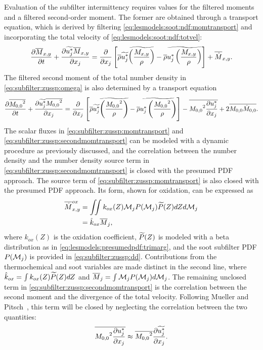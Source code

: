 Evaluation of the subfilter intermittency requires values for the filtered moments and a filtered second-order moment. The former are obtained through a transport equation, which is derived by filtering \cref{eq:lesmodels:soot:ndf:momtransport} and incorporating the total velocity of \cref{eq:lesmodels:soot:ndf:totvel}:
\begin{equation}\label{eq:subfilter:zussp:momtransport}
  \pder[\mean{M}_{x,y}]{t} + \pder[\tf{u_j^*}\mean{M}_{x,y}]{x_j} = \pder[]{x_j}\left[ \mean{\rho}\tf{u_j^*}\tf{ \left( \frac{M_{x,y}}{\rho} \right)} - \mean{\rho}\tf{u_j^* \left( \frac{M_{x,y}}{\rho}\right)} \right] + \fst[M]{x,y}.
\end{equation}
The filtered second moment of the total number density in \cref{eq:subfilter:zussp:omega} is also determined by a transport equation
\begin{equation}\label{eq:subfilter:zussp:secondmomtransport}
  \pder[\mean{{M_{0,0}}^2}]{t} + \pder[\tf{u_j^*}\mean{{M_{0,0}}^2}]{x_j} = \pder[]{x_j}\left[ \mean{\rho}\tf{u_j^*}\tf{\left( \frac{{M_{0,0}}^2}{\rho} \right)} - \mean{\rho}\tf{u_j^* \left( \frac{{M_{0,0}}^2}{\rho} \right)} \right] - \mean{{M_{0,0}}^2 \pder[u_j^*]{x_j}} + 2\mean{M_{0,0}\dot{M}_{0,0}}.
\end{equation}
The scalar fluxes in \cref{eq:subfilter:zussp:momtransport} and \cref{eq:subfilter:zussp:secondmomtransport} can be modeled with a dynamic procedure as previously discussed, and the correlation between the number density and the number density source term in \cref{eq:subfilter:zussp:secondmomtransport} is closed with the presumed PDF approach. The source term of \cref{eq:subfilter:zussp:momtransport} is also closed with the presumed PDF approach. Its form, shown for oxidation, can be expressed as
\begin{equation}\label{eq:subfilter:leszussp:ox}
  \begin{split}
    \mean{\dot{M}}_{x,y}^{ox} &= \iint k_{ox}(Z)\mc{M}_j P(\mc{M}_j)\pz dZ d\mc{M}_j \\
    &= \hat{k}_{ox}\mean{M}_j,
  \end{split}
\end{equation}
where $k_{ox}(Z)$ is the oxidation coefficient, $\pz$ is modeled with a beta distribution as in \cref{eq:lesmodels:presumedpdf:trimarg}, and the soot subfilter PDF $P(\mc{M}_j)$ is provided in \cref{eq:subfilter:zussp:dd}. Contributions from the thermochemical and soot variables are made distinct in the second line, where $\hat{k}_{ox} = \int k_{ox}(Z)\pz dZ$ and $\mean{M}_j = \int \mc{M}_j P(\mc{M}_j)d\mc{M}_j$. The remaining unclosed term in \cref{eq:subfilter:zussp:secondmomtransport} is the correlation between the second moment and the divergence of the total velocity. Following Mueller and Pitsch~\cite{subfilterpdf2011}, this term will be closed by neglecting the correlation between the two quantities:
\begin{equation}\label{eq:subfilter:zussp:nocorrelation}
  \mean{{M_{0,0}}^2 \pder[u_j^*]{x_j}} \approx \mean{{M_{0,0}}^2}\pder[\tf{u_j^*}]{x_j}.
\end{equation}
